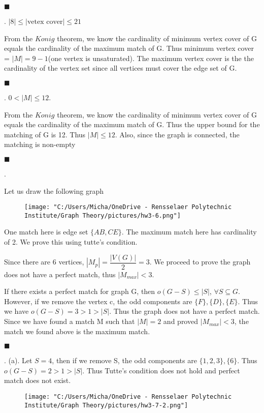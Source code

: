 \documentclass[12pt]{article}
\begin{document}
	\hfill $\blacksquare$
	
	. $|8| \leq |\text{vetex cover}| \leq 21$
	
	From the $Konig$ theorem, we know the cardinality of minimum vertex cover of G equals the cardinality of the maximum match of G. Thus minimum vertex cover = $|M| = 9 - 1$(one vertex is unsaturated). The maximum vertex cover is the the cardinality of the vertex set since all vertices must cover the edge set of G. 
	
		\hfill $\blacksquare$
	\newpage
	
	. $0<|M| \leq 12$.
	
	From the $Konig$ theorem, we know the cardinality of minimum vertex cover of G equals the cardinality of the maximum match of G. Thus the upper bound for the matching of G is 12. Thus $|M| \leq 12$. Also, since the graph is connected, the matching is non-empty
	
		\hfill $\blacksquare$
		
	.
	
	Let us draw the following graph
	\begin{figure}[h]
			\hfil\texttt{[image: "C:/Users/Micha/OneDrive - Rensselaer Polytechnic Institute/Graph Theory/pictures/hw3-6.png"]}
	\end{figure}
	One match here is edge set $\{AB, CE\}$. The maximum match here has cardinality of 2. We prove this using tutte's condition.
	
	Since there are 6 vertices, $|M_p| = \dfrac{|V(G)|}{2} = 3$. We proceed to prove the graph does not have a perfect match, thus $|M_{max}|<3$. 
	
	If there exists a perfect match for graph G, then $o(G-S) \leq |S|$,  $\forall S \subseteq G$. However, if we remove the vertex c, the odd components are $\{F\},\{D\},\{E\}$. Thus we have $o(G-S) = 3 > 1 >|S|$. Thus the graph does not have a perfect match. Since we have found a match M such that $|M| = 2$ and proved $|M_{max}| < 3$, the match we found above is the maximum match.
	
	\hfill $\blacksquare$
	
	.
	(a).
		Let $S = 4$, then if we remove S, the odd components are $\{1,2,3\}, \{6\}$. Thus $o(G-S) = 2 > 1 >|S|$. Thus Tutte's condition does not hold and perfect match does not exist.
		\begin{figure}[h]
			\hfil\texttt{[image: "C:/Users/Micha/OneDrive - Rensselaer Polytechnic Institute/Graph Theory/pictures/hw3-7-2.png"]}\\
		\end{figure}
	
\end{document}
